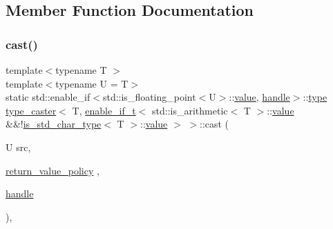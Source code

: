 \subsection{Member Function Documentation}
\mbox{\label{structtype__caster_3_01_t_00_01enable__if__t_3_01std_1_1is__arithmetic_3_01_t_01_4_1_1value_01_624f9972c532456d927e4470192416960_a2a74522a8e3d27c72ca51bebf2671157}} 
\subsubsection{\texorpdfstring{cast()}{cast()}\hspace{0.1cm}{\footnotesize\ttfamily [1/5]}}
{\footnotesize\ttfamily template$<$typename T $>$ \\
template$<$typename U  = T$>$ \\
static std\+::enable\+\_\+if$<$std\+::is\+\_\+floating\+\_\+point$<$U$>$\+::\mbox{\hyperlink{_s_d_l__opengl__glext_8h_a8ad81492d410ff2ac11f754f4042150f}{value}}, \mbox{\hyperlink{classhandle}{handle}}$>$\+::\mbox{\hyperlink{_s_d_l__opengl_8h_ad5ddf6fca7b585646515660e810e0188}{type}} \mbox{\hyperlink{classtype__caster}{type\+\_\+caster}}$<$ T, \mbox{\hyperlink{detail_2common_8h_a012819c9e8b5e04872a271f50f8b8196}{enable\+\_\+if\+\_\+t}}$<$ std\+::is\+\_\+arithmetic$<$ T $>$\+::\mbox{\hyperlink{_s_d_l__opengl__glext_8h_a8ad81492d410ff2ac11f754f4042150f}{value}} \&\&!\mbox{\hyperlink{cast_8h_a0ee0eaf3d12f9b0e472ed620777ba3c3}{is\+\_\+std\+\_\+char\+\_\+type}}$<$ T $>$\+::\mbox{\hyperlink{_s_d_l__opengl__glext_8h_a8ad81492d410ff2ac11f754f4042150f}{value}} $>$ $>$\+::cast (\begin{DoxyParamCaption}\item[{U}]{src,  }\item[{\mbox{\hyperlink{detail_2common_8h_adde72ab1fb0dd4b48a5232c349a53841}{return\+\_\+value\+\_\+policy}}}]{,  }\item[{\mbox{\hyperlink{classhandle}{handle}}}]{ }\end{DoxyParamCaption})\hspace{0.3cm}{\ttfamily [inline]}, {\ttfamily [static]}}

